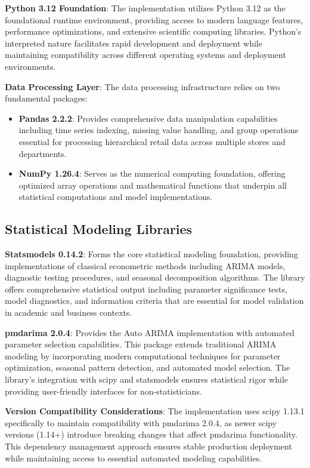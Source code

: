 \textbf{Python 3.12 Foundation}: The implementation utilizes Python 3.12 as the foundational runtime environment, providing access to modern language features, performance optimizations, and extensive scientific computing libraries. Python's interpreted nature facilitates rapid development and deployment while maintaining compatibility across different operating systems and deployment environments.

\textbf{Data Processing Layer}: The data processing infrastructure relies on two fundamental packages:
\begin{itemize}
\item \textbf{Pandas 2.2.2}: Provides comprehensive data manipulation capabilities including time series indexing, missing value handling, and group operations essential for processing hierarchical retail data across multiple stores and departments.
\item \textbf{NumPy 1.26.4}: Serves as the numerical computing foundation, offering optimized array operations and mathematical functions that underpin all statistical computations and model implementations.
\end{itemize}

\subsection{Statistical Modeling Libraries}

\textbf{Statsmodels 0.14.2}: Forms the core statistical modeling foundation, providing implementations of classical econometric methods including ARIMA models, diagnostic testing procedures, and seasonal decomposition algorithms. The library offers comprehensive statistical output including parameter significance tests, model diagnostics, and information criteria that are essential for model validation in academic and business contexts.

\textbf{pmdarima 2.0.4}: Provides the Auto ARIMA implementation with automated parameter selection capabilities. This package extends traditional ARIMA modeling by incorporating modern computational techniques for parameter optimization, seasonal pattern detection, and automated model selection. The library's integration with scipy and statsmodels ensures statistical rigor while providing user-friendly interfaces for non-statisticians.

\textbf{Version Compatibility Considerations}: The implementation uses scipy 1.13.1 specifically to maintain compatibility with pmdarima 2.0.4, as newer scipy versions (1.14+) introduce breaking changes that affect pmdarima functionality. This dependency management approach ensures stable production deployment while maintaining access to essential automated modeling capabilities.

